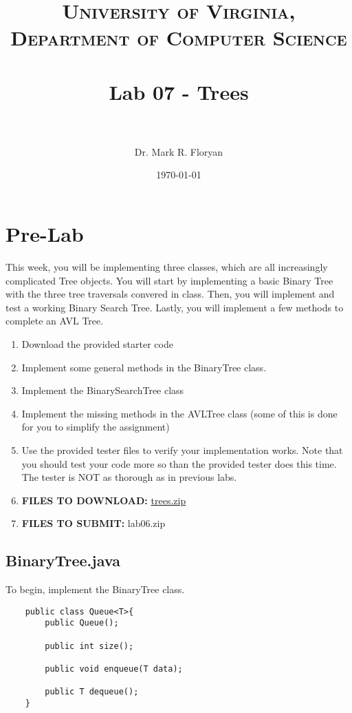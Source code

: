 \documentclass[paper=a4, fontsize=11pt, parskip=full]{scrartcl} %
\title{
\normalfont \normalsize
\textsc{University of Virginia, Department of Computer Science} \\ [25pt] %
\horrule{0.5pt} \\[0.4cm] %
\huge Lab 07 - Trees \\ %
\horrule{2pt} \\[0.5cm] %
}
\author{Dr. Mark R. Floryan} %
\date{\normalsize\today} %
\numberwithin{equation}{section} %
\numberwithin{figure}{section} %
\numberwithin{table}{section} %
\begin{document}
\maketitle %


\section{Pre-Lab}

This week, you will be implementing three classes, which are all increasingly complicated Tree objects. You will start by implementing a basic Binary Tree with the three tree traversals convered in class. Then, you will implement and test a working Binary Search Tree. Lastly, you will implement a few methods to complete an AVL Tree.

\begin{enumerate}
	\item Download the provided starter code
	\item Implement some general methods in the BinaryTree class.
	\item Implement the BinarySearchTree class
	\item Implement the missing methods in the AVLTree class (some of this is done for you to simplify the assignment)
	\item Use the provided tester files to verify your implementation works. Note that you should test your code more so than the provided tester does this time. The tester is NOT as thorough as in previous labs.
	\item \textbf{FILES TO DOWNLOAD:} \href{https://markfloryan.github.io/dsa1/labs/lab07%20-%20Trees/code/trees.zip}{trees.zip}
	\item \textbf{FILES TO SUBMIT:} lab06.zip
\end{enumerate}


\subsection{BinaryTree.java}

To begin, implement the BinaryTree class. 

\begin{lstlisting}
	public class Queue<T>{
		public Queue();

		public int size();

		public void enqueue(T data);

		public T dequeue();
	}
\end{lstlisting}
\end{document}
